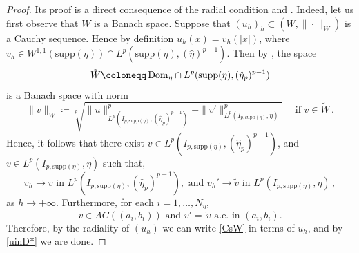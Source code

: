 \documentclass[11pt,leqno]{amsart}
\theoremstyle{remark}
\theoremstyle{definition}
\theoremstyle{definition}
\newcommand{\supp}{\mathrm{supp}}
\begin{document}
\begin{proof}
Its proof is a direct consequence of the radial condition and \cite[Proposition 2.11]{CCMH1}. Indeed, let us first observe that $W$ is a Banach space. 
Suppose that $(u_h)_h\subset (W, \|\cdot\|_W)$  is a Cauchy sequence. Hence by definition $u_{h}(x)=v_{h}(\vert x\vert)$, where $v_{h}\in W^{1,1}(\supp(\eta))\cap L^{p}(\supp(\eta),(\hat{\eta})^{p-1})$. Then by \cite[Proposition 2.11]{CCMH1}, the space 
\begin{align*}
\tilde{W}\coloneqq \,{\rm{Dom}}_\eta\cap L^{p}(\supp(\eta),(\hat{\eta}_{p})^{p-1})
\end{align*}
is a Banach space with norm 
\[
\|v\|_{\tilde{W}}\coloneqq \sqrt[p]{\|u\|_{L^{p}(I_{p,\supp(\eta)},(\hat{\eta}_{p})^{p-1})}^{p}+\|v'\|_{L^{p}(I_{p,\supp(\eta)},\eta)}^{p}}\quad\text{ if }v\in \tilde{W}\,.
\]
Hence, it follows that there exist $v\in L^{p}(I_{p,\supp(\eta)},(\hat{\eta}_{p})^{p-1})$, and $\tilde{v}\in L^{p}(I_{p,\supp(\eta)},\eta)$ such that,
\begin{equation}\label{CsW}
v_h\to v\text{ in  }L^{p}(I_{p,\supp(\eta)},(\hat{\eta}_{p})^{p-1}),\text{ and }v_{h}'\to \tilde{v}\text{ in  }L^{p}(I_{p,\supp(\eta)},\eta)\,,
\end{equation}
as $h\to+\infty$. Furthermore, for each $i=1,\dots,N_\eta$,
\begin{equation}\label{uinD*}
v\in AC((a_i,b_i)) \text{ and } v'=\,\tilde{v}\text{ a.e.  in } (a_i,b_i).
\end{equation}
Therefore, by the radiality of $(u_{h})$ we can write \eqref{CsW} in terms of $u_{h}$, and by \eqref{uinD*} we are done. 
\end{proof}
\end{document}
